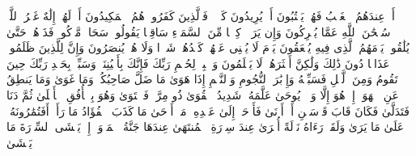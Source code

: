 \stopbuffer%
\startbuffer[\q:52:41]
أَمۡ عِندَهُمُ ٱلۡغَیۡبُ فَهُمۡ یَكۡتُبُونَ%
\stopbuffer%
\startbuffer[\q:52:42]
أَمۡ یُرِیدُونَ كَیۡدࣰاۖ فَٱلَّذِینَ كَفَرُوا۟ هُمُ ٱلۡمَكِیدُونَ%
\stopbuffer%
\startbuffer[\q:52:43]
أَمۡ لَهُمۡ إِلَٰهٌ غَیۡرُ ٱللَّهِۚ سُبۡحَٰنَ ٱللَّهِ عَمَّا یُشۡرِكُونَ%
\stopbuffer%
\startbuffer[\q:52:44]
وَإِن یَرَوۡا۟ كِسۡفࣰا مِّنَ ٱلسَّمَاۤءِ سَاقِطࣰا یَقُولُوا۟ سَحَابࣱ مَّرۡكُومࣱ%
\stopbuffer%
\startbuffer[\q:52:45]
فَذَرۡهُمۡ حَتَّىٰ یُلَٰقُوا۟ یَوۡمَهُمُ ٱلَّذِی فِیهِ یُصۡعَقُونَ%
\stopbuffer%
\startbuffer[\q:52:46]
یَوۡمَ لَا یُغۡنِی عَنۡهُمۡ كَیۡدُهُمۡ شَیۡءࣰا وَلَا هُمۡ یُنصَرُونَ%
\stopbuffer%
\startbuffer[\q:52:47]
وَإِنَّ لِلَّذِینَ ظَلَمُوا۟ عَذَابࣰا دُونَ ذَٰلِكَ وَلَٰكِنَّ أَكۡثَرَهُمۡ لَا یَعۡلَمُونَ%
\stopbuffer%
\startbuffer[\q:52:48]
وَٱصۡبِرۡ لِحُكۡمِ رَبِّكَ فَإِنَّكَ بِأَعۡیُنِنَاۖ وَسَبِّحۡ بِحَمۡدِ رَبِّكَ حِینَ تَقُومُ%
\stopbuffer%
\startbuffer[\q:52:49]
وَمِنَ ٱلَّیۡلِ فَسَبِّحۡهُ وَإِدۡبَٰرَ ٱلنُّجُومِ%
\stopbuffer%
\startbuffer[\q:53:1]
وَٱلنَّجۡمِ إِذَا هَوَىٰ%
\stopbuffer%
\startbuffer[\q:53:2]
مَا ضَلَّ صَاحِبُكُمۡ وَمَا غَوَىٰ%
\stopbuffer%
\startbuffer[\q:53:3]
وَمَا یَنطِقُ عَنِ ٱلۡهَوَىٰۤ%
\stopbuffer%
\startbuffer[\q:53:4]
إِنۡ هُوَ إِلَّا وَحۡیࣱ یُوحَىٰ%
\stopbuffer%
\startbuffer[\q:53:5]
عَلَّمَهُۥ شَدِیدُ ٱلۡقُوَىٰ%
\stopbuffer%
\startbuffer[\q:53:6]
ذُو مِرَّةࣲ فَٱسۡتَوَىٰ%
\stopbuffer%
\startbuffer[\q:53:7]
وَهُوَ بِٱلۡأُفُقِ ٱلۡأَعۡلَىٰ%
\stopbuffer%
\startbuffer[\q:53:8]
ثُمَّ دَنَا فَتَدَلَّىٰ%
\stopbuffer%
\startbuffer[\q:53:9]
فَكَانَ قَابَ قَوۡسَیۡنِ أَوۡ أَدۡنَىٰ%
\stopbuffer%
\startbuffer[\q:53:10]
فَأَوۡحَىٰۤ إِلَىٰ عَبۡدِهِۦ مَاۤ أَوۡحَىٰ%
\stopbuffer%
\startbuffer[\q:53:11]
مَا كَذَبَ ٱلۡفُؤَادُ مَا رَأَىٰۤ%
\stopbuffer%
\startbuffer[\q:53:12]
أَفَتُمَٰرُونَهُۥ عَلَىٰ مَا یَرَىٰ%
\stopbuffer%
\startbuffer[\q:53:13]
وَلَقَدۡ رَءَاهُ نَزۡلَةً أُخۡرَىٰ%
\stopbuffer%
\startbuffer[\q:53:14]
عِندَ سِدۡرَةِ ٱلۡمُنتَهَىٰ%
\stopbuffer%
\startbuffer[\q:53:15]
عِندَهَا جَنَّةُ ٱلۡمَأۡوَىٰۤ%
\stopbuffer%
\startbuffer[\q:53:16]
إِذۡ یَغۡشَى ٱلسِّدۡرَةَ مَا یَغۡشَىٰ%
\stopbuffer%
